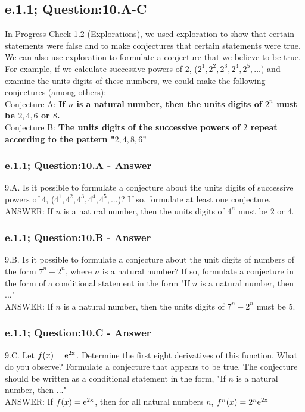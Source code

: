 \subsection{e.1.1; Question:10.A-C}

In Progress Check 1.2 (Explorations), we used exploration to show that certain statements were false and to make conjectures that certain statements were true. We can also use exploration to formulate a conjecture that we believe to be true. \\

For example, if we calculate successive powers of $2$, ($2^1, 2^2, 2^3, 2^4, 2^5, ...$) and examine the units digits of these numbers, we could make the following conjectures (among others): \\

Conjecture A: {\bf If $n$ is a natural number, then the units digits of $2^n$ must be $2, 4, 6$ or $8$.} \\

Conjecture B: {\bf The units digits of the successive powers of $2$ repeat according to the pattern "$2, 4, 8, 6$"} \\


\subsubsection*{e.1.1; Question:10.A - Answer}
9.A. Is it possible to formulate a conjecture about the units digits of successive powers of $4$, ($4^1, 4^2, 4^3, 4^4, 4^5, ...$)? If so, formulate at least one conjecture. \\
	ANSWER: If $n$ is a natural number, then the units digits of $4^n$ must be $2$ or $4$. \\

\subsubsection*{e.1.1; Question:10.B - Answer}
9.B. Is it possible to formulate a conjecture about the unit digits of numbers of the form $7^n - 2^n$, where $n$ is a natural number? If so, formulate a conjecture in the form of a conditional statement in the form "If $n$ is a natural number, then ..." \\
	ANSWER: If $n$ is a natural number, then the units digits of $7^n - 2^n$ must be $5$. \\


\subsubsection*{e.1.1; Question:10.C - Answer}
9.C. Let $f(x)=\rm{e}^{2x}$. Determine the first eight derivatives of this function. What do you observe? Formulate a conjecture that appears to be true. The conjecture should be written as a conditional statement in the form, "If $n$ is a natural number, then ..." \\
	ANSWER: If $f(x)=\rm{e}^{2x}$, then for all natural numbers $n$, $f^n(x) = 2^n\rm{e}^{2x}$ \\


